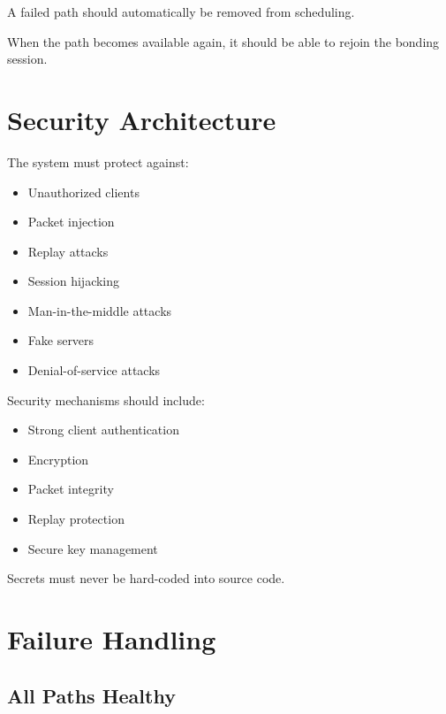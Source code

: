 \documentclass[12pt,a4paper]{article}
\begin{document}
A failed path should automatically be removed from scheduling.

When the path becomes available again, it should be able to rejoin the bonding session.


\section{Security Architecture}

The system must protect against:

\begin{itemize}
    \item Unauthorized clients
    \item Packet injection
    \item Replay attacks
    \item Session hijacking
    \item Man-in-the-middle attacks
    \item Fake servers
    \item Denial-of-service attacks
\end{itemize}

Security mechanisms should include:

\begin{itemize}
    \item Strong client authentication
    \item Encryption
    \item Packet integrity
    \item Replay protection
    \item Secure key management
\end{itemize}

Secrets must never be hard-coded into source code.


\section{Failure Handling}

\subsection{All Paths Healthy}
\end{document}
